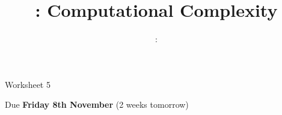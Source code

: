 \usepackage{../../beamerthemeFalmouthGamesAcademy}
\usepackage{multimedia}
\graphicspath{ {../../} }

\lstset{language=Python
}

\usepackage[normalem]{ulem}
\usepackage{wasysym}

\usepackage{algpseudocode}

\usepackage{pdfpages}

\usetikzlibrary{arrows,automata}




\title{\sessionnumber: Computational Complexity}
\subtitle{\modulecode: \moduletitle}

\frame{\titlepage} 

\begin{frame}{Worksheet 5}
    \begin{center}
        Due \textbf{Friday 8th November} (2 weeks tomorrow)
    \end{center}
\end{frame}





%









